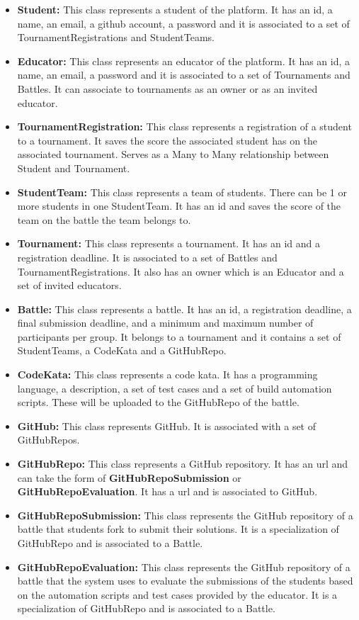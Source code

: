 \documentclass{article}
\begin{document}
\begin{itemize}
    \item \textbf{Student:} This class represents a student of the platform. It has an id, a name, an email, a github account, a password and it is associated to a set of TournamentRegistrations and StudentTeams.
    \item \textbf{Educator:} This class represents an educator of the platform. It has an id, a name, an email, a password and it is associated to a set of Tournaments and Battles. It can associate to tournaments as an owner or as an invited educator. 
    \item \textbf{TournamentRegistration:} This class represents a registration of a student to a tournament. It saves the score the associated student has on the associated tournament. Serves as a Many to Many relationship between Student and Tournament.
    \item \textbf{StudentTeam:} This class represents a team of students. There can be 1 or more students in one StudentTeam. It has an id and saves the score of the team on the battle the team belongs to.
    \item \textbf{Tournament:} This class represents a tournament. It has an id and a registration deadline. It is associated to a set of Battles and TournamentRegistrations. It also has an owner which is an Educator and a set of invited educators.
    \item \textbf{Battle:} This class represents a battle. It has an id, a registration deadline, a final submission deadline, and a minimum and maximum number of participants per group. It belongs to a tournament and it contains a set of StudentTeams, a CodeKata and a GitHubRepo.
    \item \textbf{CodeKata:} This class represents a code kata. It has a programming language, a description, a set of test cases and a set of build automation scripts. These will be uploaded to the GitHubRepo of the battle. 
    \item \textbf{GitHub:} This class represents GitHub. It is associated with a set of GitHubRepos.
    \item \textbf{GitHubRepo:} This class represents a GitHub repository. It has an url and can take the form of \textbf{GitHubRepoSubmission} or \textbf{GitHubRepoEvaluation}. It has a url and is associated to GitHub.
    \item \textbf{GitHubRepoSubmission:} This class represents the GitHub repository of a battle that students fork to submit their solutions. It is a specialization of GitHubRepo and is associated to a Battle.
    \item \textbf{GitHubRepoEvaluation:} This class represents the GitHub repository of a battle that the system uses to evaluate the submissions of the students based on the automation scripts and test cases provided by the educator. It is a specialization of GitHubRepo and is associated to a Battle.
\end{itemize}
\end{document}
